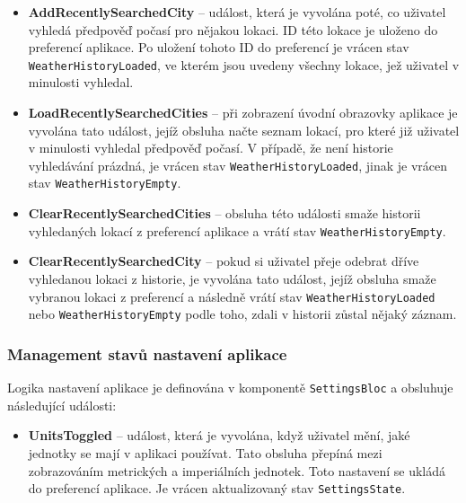 \documentclass[12pt, a4paper]{article}
\begin{document}
\begin{itemize}

	\item \textbf{AddRecentlySearchedCity} -- událost, která je vyvolána poté, co uživatel vyhledá předpověď počasí pro nějakou lokaci. ID této lokace je uloženo do preferencí aplikace. Po uložení tohoto ID do preferencí je vrácen stav \texttt{WeatherHistoryLoaded}, ve kterém jsou uvedeny všechny lokace, jež uživatel v minulosti vyhledal.

	\item \textbf{LoadRecentlySearchedCities} -- při zobrazení úvodní obrazovky aplikace je vyvolána tato událost, jejíž obsluha načte seznam lokací, pro které již uživatel v minulosti vyhledal předpověď počasí. V případě, že není historie vyhledávání prázdná, je vrácen stav \texttt{WeatherHistoryLoaded}, jinak je vrácen stav \texttt{WeatherHistoryEmpty}.

	\item \textbf{ClearRecentlySearchedCities} -- obsluha této události smaže historii vyhledaných lokací z preferencí aplikace a vrátí stav \texttt{WeatherHistoryEmpty}.

	\item \textbf{ClearRecentlySearchedCity} -- pokud si uživatel přeje odebrat dříve vyhledanou lokaci z historie, je vyvolána tato událost, jejíž obsluha smaže vybranou lokaci z preferencí a následně vrátí stav \texttt{WeatherHistoryLoaded} nebo \texttt{WeatherHistoryEmpty} podle toho, zdali v historii zůstal nějaký záznam.

\end{itemize}


\subsubsection{Management stavů nastavení aplikace}

Logika nastavení aplikace je definována v komponentě \texttt{SettingsBloc} a obsluhuje následující události:

\begin{itemize}

	\item \textbf{UnitsToggled} -- událost, která je vyvolána, když uživatel mění, jaké jednotky se mají v aplikaci používat. Tato obsluha přepíná mezi zobrazováním metrických a imperiálních jednotek. Toto nastavení se ukládá do preferencí aplikace. Je vrácen aktualizovaný stav \texttt{SettingsState}.

\end{itemize}
\end{document}
